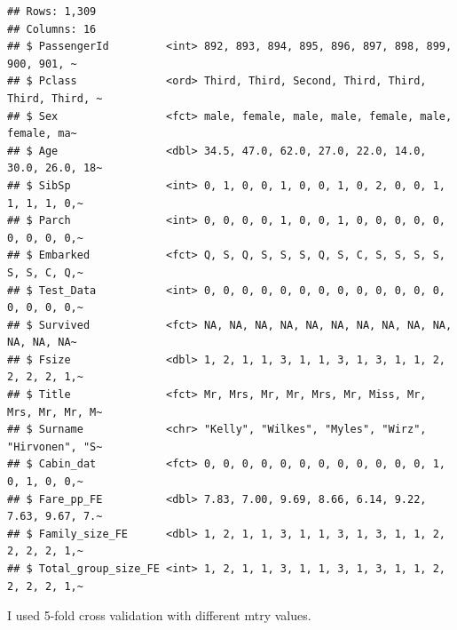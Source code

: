 \documentclass[
]{article}
\begin{document}
\begin{verbatim}
## Rows: 1,309
## Columns: 16
## $ PassengerId         <int> 892, 893, 894, 895, 896, 897, 898, 899, 900, 901, ~
## $ Pclass              <ord> Third, Third, Second, Third, Third, Third, Third, ~
## $ Sex                 <fct> male, female, male, male, female, male, female, ma~
## $ Age                 <dbl> 34.5, 47.0, 62.0, 27.0, 22.0, 14.0, 30.0, 26.0, 18~
## $ SibSp               <int> 0, 1, 0, 0, 1, 0, 0, 1, 0, 2, 0, 0, 1, 1, 1, 1, 0,~
## $ Parch               <int> 0, 0, 0, 0, 1, 0, 0, 1, 0, 0, 0, 0, 0, 0, 0, 0, 0,~
## $ Embarked            <fct> Q, S, Q, S, S, S, Q, S, C, S, S, S, S, S, S, C, Q,~
## $ Test_Data           <int> 0, 0, 0, 0, 0, 0, 0, 0, 0, 0, 0, 0, 0, 0, 0, 0, 0,~
## $ Survived            <fct> NA, NA, NA, NA, NA, NA, NA, NA, NA, NA, NA, NA, NA~
## $ Fsize               <dbl> 1, 2, 1, 1, 3, 1, 1, 3, 1, 3, 1, 1, 2, 2, 2, 2, 1,~
## $ Title               <fct> Mr, Mrs, Mr, Mr, Mrs, Mr, Miss, Mr, Mrs, Mr, Mr, M~
## $ Surname             <chr> "Kelly", "Wilkes", "Myles", "Wirz", "Hirvonen", "S~
## $ Cabin_dat           <fct> 0, 0, 0, 0, 0, 0, 0, 0, 0, 0, 0, 0, 1, 0, 1, 0, 0,~
## $ Fare_pp_FE          <dbl> 7.83, 7.00, 9.69, 8.66, 6.14, 9.22, 7.63, 9.67, 7.~
## $ Family_size_FE      <dbl> 1, 2, 1, 1, 3, 1, 1, 3, 1, 3, 1, 1, 2, 2, 2, 2, 1,~
## $ Total_group_size_FE <int> 1, 2, 1, 1, 3, 1, 1, 3, 1, 3, 1, 1, 2, 2, 2, 2, 1,~
\end{verbatim}

I used 5-fold cross validation with different mtry values.
\end{document}
